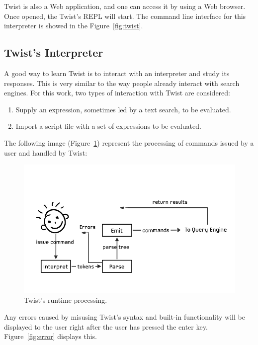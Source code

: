 Twist is also a Web application, and one can access it by using a Web browser. Once opened, the Twist's REPL will start. The command line interface for this interpreter is showed in the Figure~\ref{fig:twist}. 

\subsection{Twist's Interpreter}
\label{sec:interpreter}

A good way to learn Twist is to interact with an interpreter and study its responses. This is very similar to the way people already interact with search engines. For this work, two types of interaction with Twist are considered: 

\begin{enumerate}
	\item Supply an expression, sometimes led by a text search, to be evaluated.
	\item Import a script file with a set of expressions to be evaluated. 
\end{enumerate}	

The following image (Figure~\ref{fig:runtime}) represent the processing of commands issued by a user and handled by Twist:

\begin{figure}[!ht]
    \centering
    \includegraphics[width=\textwidth]{images/runtime}
    \caption{Twist's runtime processing.}
    \label{fig:runtime}
\end{figure} 

Any errors caused by misusing Twist's syntax and built-in functionality will be displayed to the user right after the user has pressed the enter key. Figure~\ref{fig:error} displays this.

